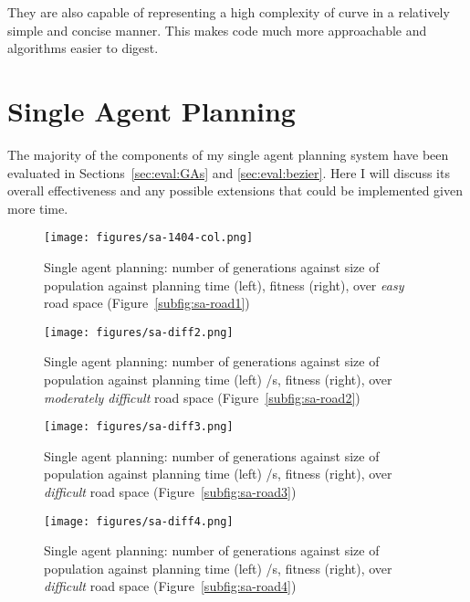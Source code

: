 They are also capable of representing a high complexity of curve in a relatively simple and concise manner. This makes code much more approachable and algorithms easier to digest.

\section{Single Agent Planning}

The majority of the components of my single agent planning system have been evaluated in Sections~\ref{sec:eval:GAs} and \ref{sec:eval:bezier}. Here I will discuss its overall effectiveness and any possible extensions that could be implemented given more time.


\begin{figure}[ht]
  \centering
  \texttt{[image: figures/sa-1404-col.png]}
  \caption{\label{fig:sa-col} Single agent planning: number of generations against size of population against planning time (left), fitness (right), over \textit{easy} road space (Figure~\ref{subfig:sa-road1})}
\end{figure}

\begin{figure}[ht]
  \centering
  \texttt{[image: figures/sa-diff2.png]}
  \caption{\label{fig:sa-diff2} Single agent planning: number of generations against size of population against planning time (left) /s, fitness (right), over \textit{moderately difficult} road space (Figure~\ref{subfig:sa-road2})}
\end{figure}

\begin{figure}[ht]
  \centering
  \texttt{[image: figures/sa-diff3.png]}
  \caption{\label{fig:sa-diff3} Single agent planning: number of generations against size of population against planning time (left) /s, fitness (right), over \textit{difficult} road space (Figure~\ref{subfig:sa-road3})}
\end{figure}

\begin{figure}[ht]
  \centering
  \texttt{[image: figures/sa-diff4.png]}
  \caption{\label{fig:sa-diff4} Single agent planning: number of generations against size of population against planning time (left) /s, fitness (right), over \textit{difficult} road space (Figure~\ref{subfig:sa-road4})}
\end{figure}

